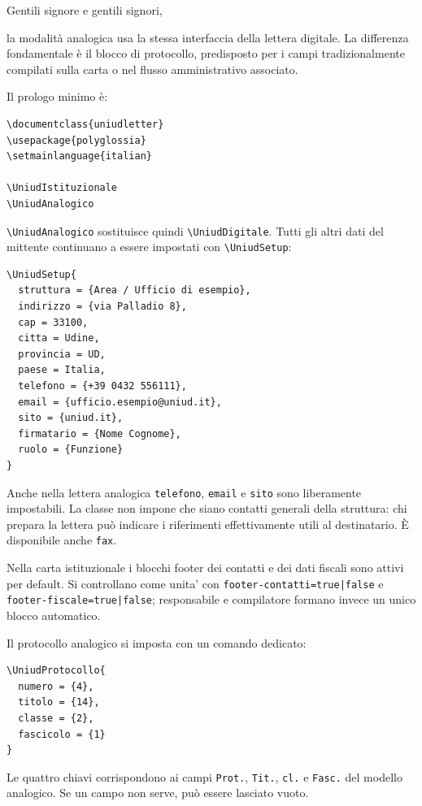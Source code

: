\documentclass{uniudletter}
\begin{document}
\begin{letter}{}
\opening{Gentili signore e gentili signori,}

la modalità analogica usa la stessa interfaccia della lettera digitale. La
differenza fondamentale è il blocco di protocollo, predisposto per i campi
tradizionalmente compilati sulla carta o nel flusso amministrativo associato.

Il prologo minimo è:

\begin{lstlisting}
\documentclass{uniudletter}
\usepackage{polyglossia}
\setmainlanguage{italian}

\UniudIstituzionale
\UniudAnalogico
\end{lstlisting}

\lstinline|\UniudAnalogico| sostituisce quindi
\lstinline|\UniudDigitale|. Tutti gli altri dati del mittente continuano a
essere impostati con \lstinline|\UniudSetup|:

\begin{lstlisting}
\UniudSetup{
  struttura = {Area / Ufficio di esempio},
  indirizzo = {via Palladio 8},
  cap = 33100,
  citta = Udine,
  provincia = UD,
  paese = Italia,
  telefono = {+39 0432 556111},
  email = {ufficio.esempio@uniud.it},
  sito = {uniud.it},
  firmatario = {Nome Cognome},
  ruolo = {Funzione}
}
\end{lstlisting}

Anche nella lettera analogica \texttt{telefono}, \texttt{email} e
\texttt{sito} sono liberamente impostabili. La classe non impone che siano
contatti generali della struttura: chi prepara la lettera può indicare i
riferimenti effettivamente utili al destinatario. È disponibile anche
\texttt{fax}.

Nella carta istituzionale i blocchi footer dei contatti e dei dati fiscali sono
attivi per default. Si controllano come unita' con
\texttt{footer-contatti=true|false} e \texttt{footer-fiscale=true|false};
responsabile e compilatore formano invece un unico blocco automatico.

Il protocollo analogico si imposta con un comando dedicato:

\begin{lstlisting}
\UniudProtocollo{
  numero = {4},
  titolo = {14},
  classe = {2},
  fascicolo = {1}
}
\end{lstlisting}

Le quattro chiavi corrispondono ai campi \texttt{Prot.}, \texttt{Tit.},
\texttt{cl.} e \texttt{Fasc.} del modello analogico. Se un campo non serve,
può essere lasciato vuoto.


\end{letter}
\end{document}
